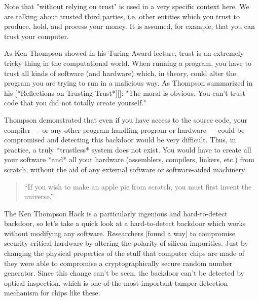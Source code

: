 Note that "without relying on trust" is used in a very specific context
here. We are talking about trusted third parties, i.e. other entities
which you trust to produce, hold, and process your money. It is assumed,
for example, that you can trust your computer.

As Ken Thompson showed in his Turing Award lecture, trust is an
extremely tricky thing in the computational world. When running a
program, you have to trust all kinds of software (and hardware) which,
in theory, could alter the program you are trying to run in a malicious
way. As Thompson summarized in his [*Reflections on Trusting Trust*][]:
"The moral is obvious. You can't trust code that you did not totally
create yourself."


Thompson demonstrated that even if you have access to the source code,
your compiler --- or any other program-handling program or
hardware --- could be compromised and detecting this backdoor would be
very difficult. Thus, in practice, a truly *trustless* system does not
exist. You would have to create all your software *and* all your
hardware (assemblers, compilers, linkers, etc.) from scratch, without
the aid of any external software or software-aided machinery.

\begin{quotation}
``If you wish to make an apple pie from scratch, you must first invent
the universe.''
\end{quotation}

The Ken Thompson Hack is a particularly ingenious and hard-to-detect
backdoor, so let's take a quick look at a hard-to-detect backdoor which
works without modifying any software. Researchers [found a way] to
compromise security-critical hardware by altering the polarity of
silicon impurities. Just by changing the physical properties of the
stuff that computer chips are made of they were able to compromise a
cryptographically secure random number generator. Since this change
can't be seen, the backdoor can't be detected by optical inspection,
which is one of the most important tamper-detection mechanism for chips
like these.


